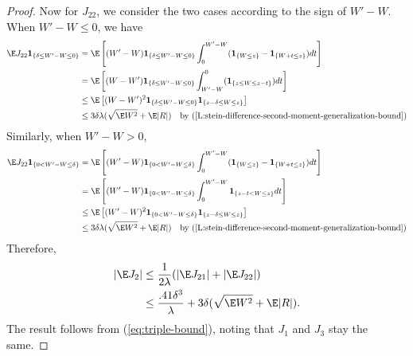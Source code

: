 \begin{proof}
  Now for $J_{22}$, we consider the two cases according to the sign of $W'-W$.  When $W' - W \leq 0$, we have
  \begin{align*}
    \E J_{22}\mathbf{1}_{\{ \delta \leq W'-W \leq 0 \}} &= \E \left [ 
      (W'-W) \mathbf{1}_{\{ \delta \leq W'-W \leq 0 \}} \int_0^{W'-W}(\mathbf{1}_{\{W \leq z\}} - 
      \mathbf{1}_{\{W + t \leq z\}}) dt \right ] \\
    &= \E \left [ 
      (W-W') \mathbf{1}_{\{ \delta \leq W'-W \leq 0 \}} \int_{W'-W}^0 (\mathbf{1}_{\{z \leq W \leq z - t\}})
      dt \right ] \\
    &\leq \E \left [ 
      (W-W')^2 \mathbf{1}_{\{ \delta \leq W'-W \leq 0 \}} \mathbf{1}_{\{ z - \delta \leq W \leq z \}} \right ] \\
    &\leq 3 \delta \lambda (\sqrt{\E W^2} + \E |R|) \quad \text{by (\ref{L:stein-difference-second-moment-generalization-bound})}
  \end{align*}
  Similarly, when $W' - W > 0$, 
  \begin{align*}
    \E J_{22}\mathbf{1}_{\{ 0 < W'-W \leq \delta \}} &= \E \left [ 
      (W'-W) \mathbf{1}_{\{ 0 < W'-W \leq \delta \}} \int_0^{W'-W}(\mathbf{1}_{\{W \leq z\}} - 
      \mathbf{1}_{\{W + t \leq z\}}) dt \right ] \\
    &= \E \left [ 
      (W'-W) \mathbf{1}_{\{ 0 < W'-W \leq \delta \}} \int_0^{W'-W} \mathbf{1}_{\{ z - t < W \leq z\}} dt \right ] \\
    &\leq \E \left [ 
      (W'-W)^2 \mathbf{1}_{\{ 0 < W'-W \leq \delta \}} \mathbf{1}_{\{ z - \delta \leq W \leq z \}} \right ] \\
    &\leq 3 \delta \lambda (\sqrt{\E W^2} + \E |R|) \quad \text{by (\ref{L:stein-difference-second-moment-generalization-bound})}
  \end{align*}
  Therefore, 
  \begin{align*}
    |\E J_{2}| &\leq \frac{1}{2\lambda}(|\E J_{21}| + |\E J_{22}|) \\
    &\leq \frac{.41\delta^3}{\lambda} + 3\delta (\sqrt{\E W^2} + \E |R|).
  \end{align*}
  The result follows from (\ref{eq:triple-bound}), noting that $J_1$ and $J_3$ stay the same.
\end{proof}

